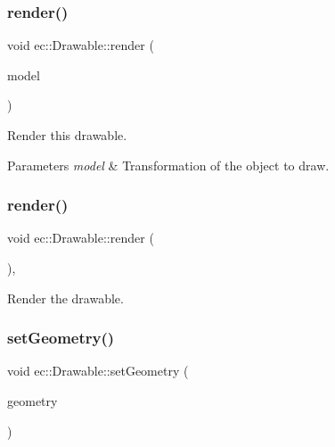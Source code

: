 \subsubsection{\texorpdfstring{render()}{render()}\hspace{0.1cm}{\footnotesize\ttfamily [1/2]}}
{\footnotesize\ttfamily void ec\+::\+Drawable\+::render (\begin{DoxyParamCaption}\item[{const glm\+::mat4 \&}]{model }\end{DoxyParamCaption})\hspace{0.3cm}{\ttfamily [virtual]}}



Render this drawable. 


\begin{DoxyParams}{Parameters}
{\em model} & Transformation of the object to draw. \\
\hline
\end{DoxyParams}
\mbox{\label{classec_1_1_drawable_a7da17eae29c09e49d1a8c2c48e85f88a}} 
\subsubsection{\texorpdfstring{render()}{render()}\hspace{0.1cm}{\footnotesize\ttfamily [2/2]}}
{\footnotesize\ttfamily void ec\+::\+Drawable\+::render (\begin{DoxyParamCaption}{ }\end{DoxyParamCaption})\hspace{0.3cm}{\ttfamily [protected]}, {\ttfamily [virtual]}}



Render the drawable. 

\mbox{\label{classec_1_1_drawable_a76bcb843ef5ced898724fa79a9b20250}} 
\subsubsection{\texorpdfstring{set\+Geometry()}{setGeometry()}}
{\footnotesize\ttfamily void ec\+::\+Drawable\+::set\+Geometry (\begin{DoxyParamCaption}\item[{\mbox{\hyperlink{classec_1_1_i_geometry_access}{I\+Geometry\+Access}} $\ast$}]{geometry }\end{DoxyParamCaption})}



